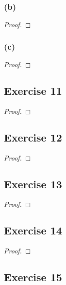 \documentclass[14pt]{extarticle}
\begin{document}
\subsubsection{(b)}

\begin{proof}

\end{proof}

\subsubsection{(c)}

\begin{proof}

\end{proof}

\subsection{Exercise 11}

\begin{proof}

\end{proof}

\subsection{Exercise 12}

\begin{proof}

\end{proof}

\subsection{Exercise 13}

\begin{proof}

\end{proof}

\subsection{Exercise 14}

\begin{proof}

\end{proof}

\subsection{Exercise 15}
\end{document}
